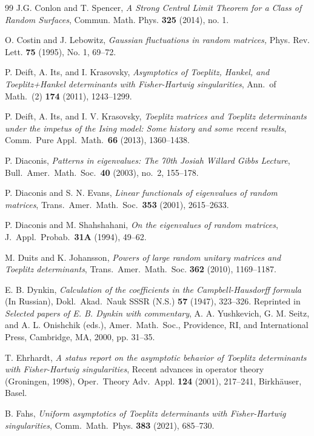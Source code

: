 \documentclass[11pt]{amsart}
\theoremstyle{plain}
\theoremstyle{remark}
\numberwithin{equation}{section}
\begin{document}
\begin{thebibliography}{99}
 J.G. Conlon and T. Spencer, \emph{A Strong Central Limit Theorem for a Class of Random Surfaces}, Commun. Math.
Phys. \textbf{325} (2014), no. 1.

 O. Costin and J. Lebowitz, \emph{Gaussian fluctuations in random matrices,} Phys. Rev. Lett. \textbf{75} (1995), No. 1, 69--72.


 P. Deift, A. Its, and I. Krasovsky, \emph{Asymptotics of Toeplitz, Hankel, and Toeplitz+Hankel determinants with Fisher-Hartwig singularities}, Ann.\ of Math.\ (2) \textbf{174} (2011), 1243--1299.

P. Deift, A. Its, and I. V. Krasovsky,
\emph{Toeplitz matrices and Toeplitz determinants under the impetus of the Ising model: Some history and some recent results},
Comm.\ Pure Appl.\ Math.\ \textbf{66} (2013), 1360--1438.

P. Diaconis,
\emph{Patterns in eigenvalues: The 70th Josiah Willard Gibbs Lecture},
Bull.\ Amer.\ Math.\ Soc.\ \textbf{40} (2003), no.~2, 155--178.

P. Diaconis and S. N. Evans,
\emph{Linear functionals of eigenvalues of random matrices},
Trans.\ Amer.\ Math.\ Soc.\ \textbf{353} (2001), 2615--2633.

P. Diaconis and M. Shahshahani,
\emph{On the eigenvalues of random matrices},
J.\ Appl.\ Probab.\ \textbf{31A} (1994), 49--62.

 M. Duits and K. Johansson, \emph{Powers of large random unitary matrices and Toeplitz determinants}, Trans.\ Amer.\ Math.\ Soc. \textbf{362} (2010), 1169--1187.

 E. B. Dynkin, \emph{Calculation of the coefficients in the Campbell-Hausdorff formula} (In Russian), Dokl.\ Akad.\ Nauk SSSR (N.S.) \textbf{57} (1947), 323--326. Reprinted in \emph{Selected papers of E. B. Dynkin with commentary}, A. A. Yushkevich, G. M. Seitz, and A. L. Onishchik (eds.), Amer.\ Math.\ Soc., Providence, RI, and International Press, Cambridge, MA, 2000, pp. 31--35.

 T. Ehrhardt, \emph{A status report on the asymptotic behavior of Toeplitz determinants with Fisher-Hartwig singularities}, Recent advances in operator theory (Groningen, 1998), Oper.\ Theory Adv.\ Appl. \textbf{124} (2001), 217--241, Birkhäuser, Basel.

 B. Fahs, \emph{Uniform asymptotics of Toeplitz determinants with Fisher-Hartwig singularities}, Comm.\ Math.\ Phys. \textbf{383} (2021), 685--730.


\end{thebibliography}
\end{document}
